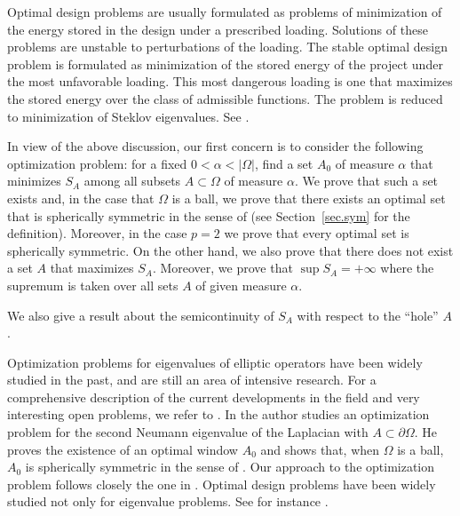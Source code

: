 \documentclass[11pt]{amsart}
\theoremstyle{remark}
\numberwithin{equation}{section}
\begin{document}
Optimal design problems are usually formulated as problems of minimization of the energy stored in the design under a prescribed loading. Solutions of these problems are unstable to perturbations of the loading. The stable optimal design problem is formulated as minimization of the stored energy of the project under the most unfavorable loading. This most dangerous loading is one that maximizes the stored energy over the class of admissible functions. The problem is reduced to minimization of Steklov eigenvalues. See \cite{CC}.

In view of the above discussion, our first concern is to consider the following optimization problem: for a fixed $0<\alpha<|\Omega|$, find a set $A_0$ of measure $\alpha$ that minimizes $S_A$ among all subsets $A\subset\Omega$ of measure $\alpha$. We prove that such a set exists and, in the case that $\Omega$ is a ball, we prove that there exists an optimal set that is spherically symmetric in the sense of \cite{Sp} (see Section~\ref{sec.sym} for the definition). Moreover, in the case $p=2$ we prove that every optimal set is spherically symmetric. On the other hand, we also prove that there does not exist a set $A$ that maximizes $S_A$. Moreover, we prove that $\sup S_A=+\infty$ where the supremum is taken over all sets $A$ of given measure $\alpha$.

We also give a result about the semicontinuity of $S_A$ with respect to the ``hole'' $A$.

Optimization problems for eigenvalues of elliptic operators have been widely studied in the past, and are still an area of intensive research. For a comprehensive description of the current developments in the field and very interesting open problems, we refer to \cite{He}. In \cite{De} the author studies an optimization problem for the second Neumann eigenvalue of the Laplacian with $A\subset\partial\Omega$. He proves the existence of an optimal window $A_0$ and shows that, when $\Omega$ is a ball, $A_0$ is spherically symmetric in the sense of \cite{Sp}. Our approach to the optimization problem follows closely the one in \cite{De}. Optimal design problems have been widely studied not only for eigenvalue problems. See for instance \cite{AAC,Ka,Le}.
\end{document}
